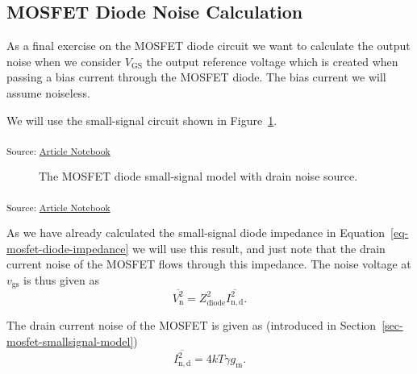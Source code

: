 \documentclass[
  a4paper,
  DIV=11,
  numbers=noendperiod]{scrartcl}
\begin{document}
\subsection{MOSFET Diode Noise
Calculation}\label{mosfet-diode-noise-calculation}

As a final exercise on the MOSFET diode circuit we want to calculate the
output noise when we consider \(V_\mathrm{GS}\) the output reference
voltage which is created when passing a bias current through the MOSFET
diode. The bias current we will assume noiseless.

We will use the small-signal circuit shown in
Figure~\ref{fig-mosfet-diode-small-signal-w-noise}.

\textsubscript{Source:
\href{https://iic-jku.github.io/analog-circuit-design/index.qmd.html}{Article
Notebook}}

\begin{figure}[H]


\caption{\label{fig-mosfet-diode-small-signal-w-noise}The MOSFET diode
small-signal model with drain noise source.}

\end{figure}%

\textsubscript{Source:
\href{https://iic-jku.github.io/analog-circuit-design/index.qmd.html}{Article
Notebook}}

As we have already calculated the small-signal diode impedance in
Equation~\ref{eq-mosfet-diode-impedance} we will use this result, and
just note that the drain current noise of the MOSFET flows through this
impedance. The noise voltage at \(v_\mathrm{gs}\) is thus given as \[
\overline{V_\mathrm{n}^2} = Z_\mathrm{diode}^2 \overline{I_\mathrm{n,d}^2}.
\]

The drain current noise of the MOSFET is given as (introduced in
Section~\ref{sec-mosfet-smallsignal-model}) \[
\overline{I_\mathrm{n,d}^2} = 4 k T \gamma g_\mathrm{m}.
\]
\end{document}
